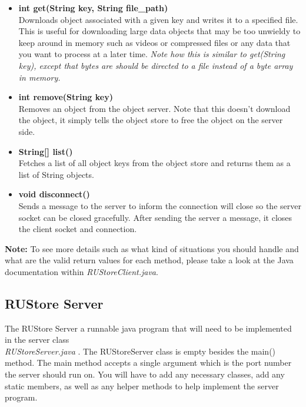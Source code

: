 \documentclass{article}
\begin{document}
\begin{itemize}
    \item \textbf{int get(String key, String file\_path)} \vspace{0.1cm} \\
            Downloads object associated with a given key and writes it to a specified file. This is useful for downloading large data objects that may be too unwieldy to keep around in memory such as videos or compressed files or any data that you want to process at a later time. \textit{Note how this is similar to get(String key), except that bytes are should be directed to a file instead of a byte array in memory.}
    \item \textbf{int remove(String key)} \vspace{0.1cm} \\
            Removes an object from the object server. Note that this doesn't download the object, it simply tells the object store to free the object on the server side. 
    \item \textbf{String[] list()} \vspace{0.1cm} \\
            Fetches a list of all object keys from the object store and returns them as a list of String objects.
    \item \textbf{void disconnect()} \vspace{0.1cm} \\
            Sends a message to the server to inform the connection will close so the server socket can be closed gracefully. After sending the server a message, it closes the client socket and connection. 
            
\end{itemize}

\noindent \textbf{Note:} To see more details such as what kind of situations you should handle and what are the valid return values for each method, please take a look at the Java documentation within \textit{RUStoreClient.java}.

\subsection*{RUStore Server}
The RUStore Server a runnable java program that will need to be implemented in the server class\\ \textit{RUStoreServer.java} . The RUStoreServer class is empty besides the main() method. The main method accepts a single argument which is the port number the server should run on. You will have to add any necessary classes, add any static members, as well as any helper methods to help implement the server program. 
\end{document}
